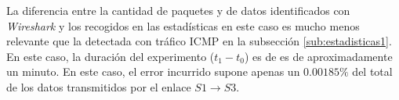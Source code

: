 \documentclass[a4paper,11pt]{book}
\begin{document}
\begin{center}
\begin{table}[tb]
\centering
{}
\caption{Estadísticas recogidas enlace S1-S3 para el envío de vídeo sobre RTP.}\label{tab:rtpStatistics}
\end{table}
\end{center}


La diferencia entre la cantidad de paquetes y de datos identificados con \emph{Wireshark} y los recogidos en las estadísticas en este caso es mucho menos relevante que la detectada con tráfico \ac{ICMP} en la subsección \ref{sub:estadisticas1}. En este caso, la duración del experimento ($t_1-t_0$) es de  es de aproximadamente un minuto. En este caso, el error incurrido supone apenas un $0.00185\%$ del total de los datos transmitidos por el enlace $S1 \rightarrow S3$.
\end{document}

